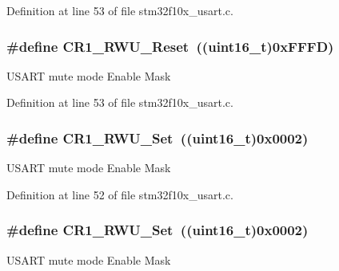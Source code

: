 Definition at line 53 of file stm32f10x\+\_\+usart.\+c.

\subsubsection[{\texorpdfstring{C\+R1\+\_\+\+R\+W\+U\+\_\+\+Reset}{CR1_RWU_Reset}}]{\setlength{\rightskip}{0pt plus 5cm}\#define C\+R1\+\_\+\+R\+W\+U\+\_\+\+Reset~(({\bf uint16\+\_\+t})0x\+F\+F\+F\+D)}\hypertarget{group___u_s_a_r_t___private___defines_ga064a46d19ffffddd410e969798d335ee}{}\label{group___u_s_a_r_t___private___defines_ga064a46d19ffffddd410e969798d335ee}
U\+S\+A\+RT mute mode Enable Mask 

Definition at line 53 of file stm32f10x\+\_\+usart.\+c.

\subsubsection[{\texorpdfstring{C\+R1\+\_\+\+R\+W\+U\+\_\+\+Set}{CR1_RWU_Set}}]{\setlength{\rightskip}{0pt plus 5cm}\#define C\+R1\+\_\+\+R\+W\+U\+\_\+\+Set~(({\bf uint16\+\_\+t})0x0002)}\hypertarget{group___u_s_a_r_t___private___defines_ga5cb566b7c5e126e5ef11dd25bba50ffa}{}\label{group___u_s_a_r_t___private___defines_ga5cb566b7c5e126e5ef11dd25bba50ffa}
U\+S\+A\+RT mute mode Enable Mask 

Definition at line 52 of file stm32f10x\+\_\+usart.\+c.

\subsubsection[{\texorpdfstring{C\+R1\+\_\+\+R\+W\+U\+\_\+\+Set}{CR1_RWU_Set}}]{\setlength{\rightskip}{0pt plus 5cm}\#define C\+R1\+\_\+\+R\+W\+U\+\_\+\+Set~(({\bf uint16\+\_\+t})0x0002)}\hypertarget{group___u_s_a_r_t___private___defines_ga5cb566b7c5e126e5ef11dd25bba50ffa}{}\label{group___u_s_a_r_t___private___defines_ga5cb566b7c5e126e5ef11dd25bba50ffa}
U\+S\+A\+RT mute mode Enable Mask 


